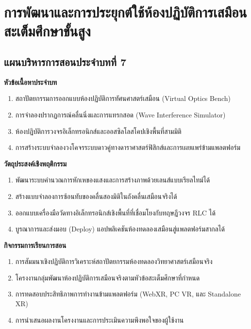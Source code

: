 \chapter{การพัฒนาและการประยุกต์ใช้ห้องปฏิบัติการเสมือนสะเต็มศึกษาขั้นสูง}
\label{chap:ch07}

\section*{แผนบริหารการสอนประจำบทที่ 7}

\noindent\textbf{หัวข้อเนื้อหาประจำบท}
\begin{enumerate}
    \item สถาปัตยกรรมการออกแบบห้องปฏิบัติการทัศนศาสตร์เสมือน (Virtual Optics Bench)
    \item การจำลองปรากฏการณ์คลื่นนิ่งและการแทรกสอด (Wave Interference Simulator)
    \item ห้องปฏิบัติการวงจรอิเล็กทรอนิกส์และออสซิลโลสโคปเชิงพื้นที่สามมิติ
    \item การสร้างระบบจำลองวงโคจรระบบดาวคู่ทางดาราศาสตร์ฟิสิกส์และการเผยแพร่ข้ามแพลตฟอร์ม
\end{enumerate}

\noindent\textbf{วัตถุประสงค์เชิงพฤติกรรม}
\begin{enumerate}
    \item พัฒนาระบบคำนวณการหักเหของแสงและการสร้างภาพด้วยเลนส์แบบเรียลไทม์ได้
    \item สร้างแบบจำลองการซ้อนทับของคลื่นสองมิติในถังคลื่นเสมือนจริงได้
    \item ออกแบบเครื่องมือวัดทางอิเล็กทรอนิกส์เชิงพื้นที่ที่เชื่อมโยงกับทฤษฎีวงจร RLC ได้
    \item บูรณาการและส่งมอบ (Deploy) แอปพลิเคชันห้องทดลองเสมือนสู่แพลตฟอร์มสากลได้
\end{enumerate}

\newpage

\noindent\textbf{กิจกรรมการเรียนการสอน}
\begin{enumerate}
    \item การสัมมนาเชิงปฏิบัติการวิเคราะห์สถาปัตยกรรมห้องทดลองวิทยาศาสตร์เสมือนจริง
    \item โครงงานกลุ่มพัฒนาห้องปฏิบัติการเสมือนจริงตามหัวข้อสะเต็มศึกษาที่กำหนด
    \item การทดสอบประสิทธิภาพการทำงานข้ามแพลตฟอร์ม (WebXR, PC VR, และ Standalone XR)
    \item การนำเสนอผลงานโครงงานและการประเมินความพึงพอใจของผู้ใช้งาน
\end{enumerate}

